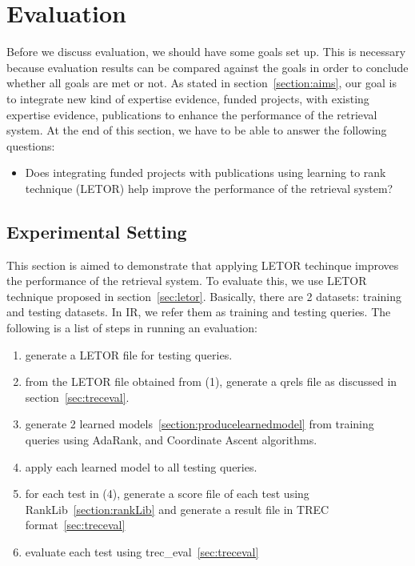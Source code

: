 
\section{Evaluation}\label{sec:evaluation}

Before we discuss evaluation, we should have some goals set up. This is necessary because evaluation results can be compared against the goals in order to
conclude whether all goals are met or not. As stated in section~\ref{section:aims}, our goal is to integrate new kind of expertise evidence, funded projects,
with existing expertise evidence, publications to enhance the performance of the retrieval system. At the end of this section, we have to be able to 
answer the following questions:

\begin{itemize}
 \item Does integrating funded projects with publications using learning to rank technique (LETOR) help improve the performance of the retrieval system?
\end{itemize}


\subsection{Experimental Setting}
This section is aimed to demonstrate that applying LETOR techinque improves the performance of the retrieval system. To evaluate this, we use LETOR
technique proposed in section~\ref{sec:letor}. Basically, there are 2 datasets: training and testing datasets. In IR, 
we refer them as training and testing queries. The following is a list of steps in running an evaluation:
\begin{enumerate}
 \item generate a LETOR file for testing queries.
 \item from the LETOR file obtained from (1), generate a qrels file as discussed in section~\ref{sec:treceval}.
 \item generate 2 learned models~\ref{section:producelearnedmodel} from training queries using AdaRank, and Coordinate Ascent algorithms.
 \item apply each learned model to all testing queries.
 \item for each test in (4), generate a score file of each test using RankLib~\ref{section:rankLib} and generate a result file in TREC format~\ref{sec:treceval}
 \item evaluate each test using trec\_eval~\ref{sec:treceval}
\end{enumerate}

